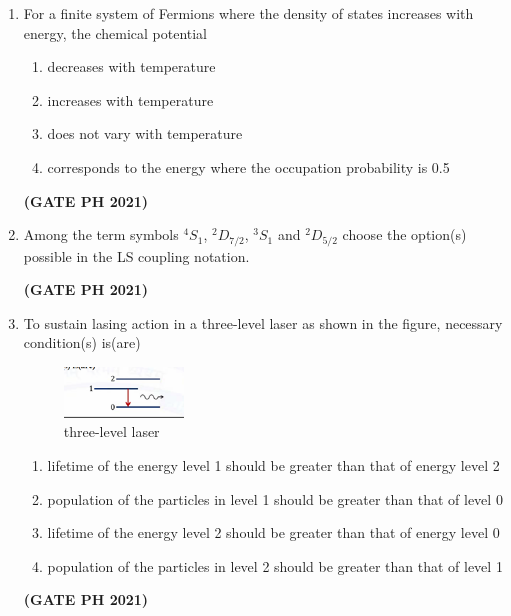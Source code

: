 \documentclass[14pt, a4paper]{extarticle}
\begin{document}
\begin{enumerate}[label=\textbf{Q.\arabic*}]
\begin{enumerate}[label=\textbf{Q.\arabic*}]
\item For a finite system of Fermions where the density of states increases with energy, the chemical potential
\begin{enumerate}
\item decreases with temperature
\item increases with temperature
\item does not vary with temperature
\item corresponds to the energy where the occupation probability is 0.5
\end{enumerate}
\hfill \textbf{(GATE PH 2021)}

\item Among the term symbols $^4S_1$, $^2D_{7/2}$, $^3S_1$ and $^2D_{5/2}$ choose the option(s) possible in the LS coupling notation.
\begin{enumerate}
\end{enumerate}
\hfill \textbf{(GATE PH 2021)}

\item To sustain lasing action in a three-level laser as shown in the figure, necessary condition(s) is(are)
\begin{figure}[H]
\centering
\includegraphics[width=0.3\textwidth]{figs/q25fig21.png}
\caption{three-level laser}
\end{figure}
\begin{enumerate}
\item lifetime of the energy level 1 should be greater than that of energy level 2
\item population of the particles in level 1 should be greater than that of level 0
\item lifetime of the energy level 2 should be greater than that of energy level 0
\item population of the particles in level 2 should be greater than that of level 1
\end{enumerate}
\hfill \textbf{(GATE PH 2021)}


\end{enumerate}
\end{enumerate}
\end{document}
